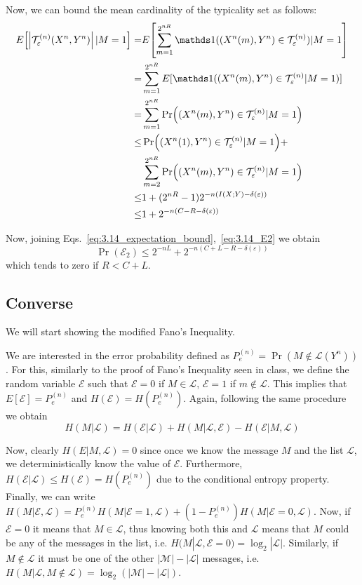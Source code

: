 Now, we can bound the mean cardinality of the typicality set as follows:
%
\begin{align} \label{eq:3.14_expectation_bound}
\begin{split}
E \qty[\qty|\typicalLong| \,|M=1] =& E\qty[ \sum_{m=1}^{2^{nR}} \indicator((X^n(m),Y^n) \in \typical) |M=1 ]\\
=& \sum_{m=1}^{2^{nR}} E[\indicator((X^n(m),Y^n)\in \typical |M=1)]\\
=& \sum_{m=1}^{2^{nR}} \Pr((X^n(m),Y^n)\in \typical |M=1)\\
\leq& \Pr((X^n(1),Y^n)\in \typical |M=1) +\\
&\sum_{m=2}^{2^{nR}} \Pr((X^n(m),Y^n)\in \typical |M=1)\\
\leq& 1 + (2^{nR}-1)2^{-n(I(X;Y)-\delta(\varepsilon))}\\
\leq& 1 + 2^{-n(C-R - \delta(\varepsilon))}
\end{split}
\end{align}

Now, joining Eqs.~\eqref{eq:3.14_expectation_bound},~\eqref{eq:3.14_E2} we obtain
%
\begin{equation}
\Pr(\mathcal{E}_2) \leq 2^{-nL} + 2^{-n(C+L-R - \delta(\varepsilon))}
\end{equation}
%
which tends to zero if $R<C+L$.

\subsection{Converse}
We will start showing the modified Fano's Inequality.

We are interested in the error probability defined as $P_e^{(n)} = \Pr(M \notin \mathcal{L}(Y^n))$. For this, similarly to the proof of Fano's Inequality seen in class, we define the random variable $\mathcal{E}$ such that $\mathcal{E}=0$ if $M \in \mathcal{L}$, $\mathcal{E}=1$ if $m \notin \mathcal{L}$. This implies that $E[\mathcal{E}] = P_e^{(n)}$ and $H(\mathcal{E}) = H(P_e^{(n)})$. Again, following the same procedure we obtain
%
\begin{equation}
H(M|\mathcal{L}) = H(\mathcal{E}|\mathcal{L})
+H(M|\mathcal{L},\mathcal{E})
-H(\mathcal{E}|M,\mathcal{L})
\end{equation}

Now, clearly $H(E|M,\mathcal{L})=0$ since once we know the message $M$ and the list $\mathcal{L}$, we deterministically know the value of $\mathcal{E}$. Furthermore, $H(\mathcal{E}|\mathcal{L}) \leq H(\mathcal{E}) = H(P_e^{(n)})$ due to the conditional entropy property. Finally, we can write $H(M|\mathcal{E},\mathcal{L}) = P_e^{(n)} H(M|\mathcal{E}=1,\mathcal{L}) + (1-P_e^{(n)})H(M|\mathcal{E}=0,\mathcal{L})$. Now, if $\mathcal{E}=0$ it means that $M \in \mathcal{L}$, thus knowing both this and $\mathcal{L}$ means that $M$ could be any of the messages in the list, i.e. $H(M|\mathcal{L},\mathcal{E}=0) = \log_2|\mathcal{L}|$. Similarly, if $M \notin \mathcal{L}$ it must be one of the other $|\mathcal{M}|-|\mathcal{L}|$ messages, i.e. $H(M|\mathcal{L},M\notin \mathcal{L})=\log_2(|\mathcal{M}|-|\mathcal{L}|)$.

